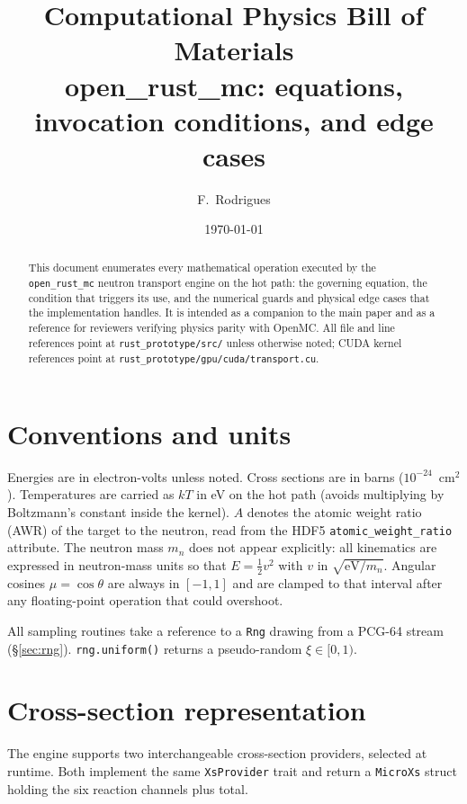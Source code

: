 \documentclass[11pt,a4paper]{article}
\title{Computational Physics Bill of Materials\\
\large open\_rust\_mc: equations, invocation conditions, and edge cases}
\author{F.~Rodrigues}
\date{\today}
\begin{document}
\maketitle

\begin{abstract}
This document enumerates every mathematical operation executed by the
\texttt{open\_rust\_mc} neutron transport engine on the hot path:
the governing equation, the condition that triggers its use, and the
numerical guards and physical edge cases that the implementation
handles. It is intended as a companion to the main paper and as a
reference for reviewers verifying physics parity with OpenMC. All
file and line references point at
\texttt{rust\_prototype/src/} unless otherwise noted; CUDA kernel
references point at \texttt{rust\_prototype/gpu/cuda/transport.cu}.
\end{abstract}

\tableofcontents

\section{Conventions and units}

Energies are in electron-volts unless noted. Cross sections are in
barns ($10^{-24}$~cm$^2$). Temperatures are carried as $kT$ in eV
on the hot path (avoids multiplying by Boltzmann's constant inside
the kernel). $A$ denotes the atomic weight ratio (AWR) of the target
to the neutron, read from the HDF5 \texttt{atomic\_weight\_ratio}
attribute. The neutron mass $m_n$ does not appear explicitly:
all kinematics are expressed in neutron-mass units so that
$E = \tfrac{1}{2} v^2$ with $v$ in $\sqrt{\mathrm{eV}/m_n}$.
Angular cosines $\mu = \cos\theta$ are always in $[-1, 1]$ and are
clamped to that interval after any floating-point operation that
could overshoot.

All sampling routines take a reference to a \texttt{Rng} drawing
from a PCG-64 stream (\S\ref{sec:rng}). \texttt{rng.uniform()}
returns a pseudo-random $\xi \in [0, 1)$.

\section{Cross-section representation}

The engine supports two interchangeable cross-section providers,
selected at runtime. Both implement the same \texttt{XsProvider}
trait and return a \texttt{MicroXs} struct holding the six
reaction channels plus total.
\end{document}
